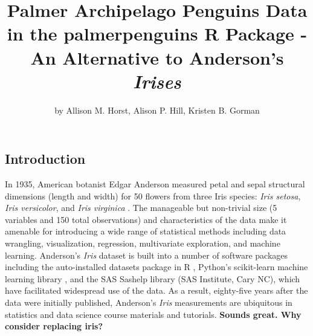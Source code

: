 \title{Palmer Archipelago Penguins Data in the palmerpenguins R Package - An Alternative to Anderson's \emph{Irises}}
\author{by Allison M. Horst, Alison P. Hill, Kristen B. Gorman}

\maketitle


\hypertarget{introduction}{%
\subsection{Introduction}\label{introduction}}

In 1935, American botanist Edgar Anderson measured petal and sepal structural dimensions (length and width) for 50 flowers from three Iris species: \emph{Iris setosa}, \emph{Iris versicolor}, and \emph{Iris virginica} \citep{anderson_irises_1935}. The manageable but non-trivial size (5 variables and 150 total observations) and characteristics of the data make it amenable for introducing a wide range of statistical methods including data wrangling, visualization, regression, multivariate exploration, and machine learning. Anderson's \emph{Iris} dataset is built into a number of software packages including the auto-installed datasets package in R \citep{r_core_team_r_2019}, Python's scikit-learn machine learning library \citep{pedregosa_scikit-learn_2011}, and the SAS Sashelp library (SAS Institute, Cary NC), which have facilitated widespread use of the data. As a result, eighty-five years after the data were initially published, Anderson's \emph{Iris} measurements are ubiquitous in statistics and data science course materials and tutorials. \textbf{Sounds great. Why consider replacing iris?}

